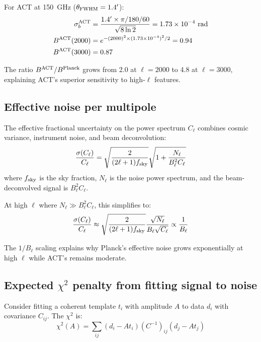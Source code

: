\documentclass[twocolumn,showpacs,preprintnumbers,amsmath,amssymb,prd]{revtex4-2}
\begin{document}
For ACT at 150~GHz ($\theta_{\rm FWHM} = 1.4'$):
\begin{align}
\sigma_b^{\rm ACT} &= \frac{1.4' \times \pi/180/60}{\sqrt{8\ln 2}} 
= 1.73 \times 10^{-4}~\text{rad} \\
B^{\rm ACT}(2000) &= e^{-(2000)^2 \times (1.73\times 10^{-4})^2/2} = 0.94 \\
B^{\rm ACT}(3000) &= 0.87
\end{align}

The ratio $B^{\rm ACT}/B^{\rm Planck}$ grows from 2.0 at $\ell = 2000$ to 4.8 
at $\ell = 3000$, explaining ACT's superior sensitivity to high-$\ell$ features.

\subsection{Effective noise per multipole}

The effective fractional uncertainty on the power spectrum $C_\ell$ combines 
cosmic variance, instrument noise, and beam deconvolution:
\begin{equation}
\frac{\sigma(C_\ell)}{C_\ell} = \sqrt{\frac{2}{(2\ell+1)f_{\rm sky}}} 
\sqrt{1 + \frac{N_\ell}{B_\ell^2 C_\ell}}
\end{equation}
where $f_{\rm sky}$ is the sky fraction, $N_\ell$ is the noise power spectrum, 
and the beam-deconvolved signal is $B_\ell^2 C_\ell$.

At high $\ell$ where $N_\ell \gg B_\ell^2 C_\ell$, this simplifies to:
\begin{equation}
\frac{\sigma(C_\ell)}{C_\ell} \approx \sqrt{\frac{2}{(2\ell+1)f_{\rm sky}}} 
\frac{\sqrt{N_\ell}}{B_\ell \sqrt{C_\ell}} \propto \frac{1}{B_\ell}
\end{equation}

The $1/B_\ell$ scaling explains why Planck's effective noise grows exponentially 
at high $\ell$ while ACT's remains moderate.

\subsection{Expected $\chi^2$ penalty from fitting signal to noise}

Consider fitting a coherent template $t_i$ with amplitude $A$ to data $d_i$ 
with covariance $C_{ij}$. The $\chi^2$ is:
\begin{equation}
\chi^2(A) = \sum_{ij} (d_i - A t_i)(C^{-1})_{ij}(d_j - A t_j)
\end{equation}
\end{document}
